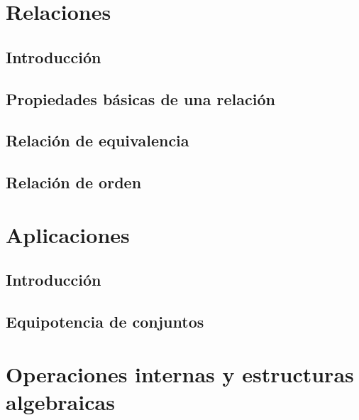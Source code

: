 \documentclass[10pt]{book}
\begin{document}
\chapter{Relaciones}%
\label{ch:relaciones}



  \section{Introducción}
  


  \section{Propiedades básicas de una relación}
  


  \section{Relación de equivalencia}
  


  \section{Relación de orden}
  




\chapter{Aplicaciones}%
\label{ch:aplicaciones}


  \section{Introducción}
  


  \section{Equipotencia de conjuntos}\label{sec:equipotencia-conjuntos}
  





\chapter{Operaciones internas y estructuras algebraicas}%
\label{ch:op_internas}
\end{document}
